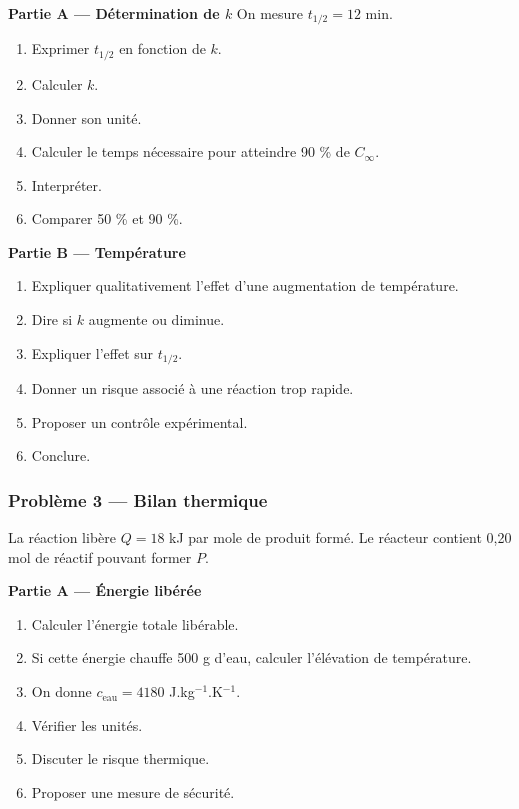 \documentclass[11pt,a4paper]{article}
\begin{document}
\begin{difficile}
\textbf{Partie A — Détermination de $k$}
On mesure $t_{1/2}=12$ min.
\begin{enumerate}
  \item Exprimer $t_{1/2}$ en fonction de $k$.
  \item Calculer $k$.
  \item Donner son unité.
  \item Calculer le temps nécessaire pour atteindre 90 \% de $C_\infty$.
  \item Interpréter.
  \item Comparer 50 \% et 90 \%.
\end{enumerate}

\textbf{Partie B — Température}
\begin{enumerate}
  \item Expliquer qualitativement l'effet d'une augmentation de température.
  \item Dire si $k$ augmente ou diminue.
  \item Expliquer l'effet sur $t_{1/2}$.
  \item Donner un risque associé à une réaction trop rapide.
  \item Proposer un contrôle expérimental.
  \item Conclure.
\end{enumerate}

\subsubsection*{Problème 3 — Bilan thermique}

La réaction libère $Q=18$ kJ par mole de produit formé. Le réacteur contient 0,20 mol de réactif pouvant former $P$.

\textbf{Partie A — Énergie libérée}
\begin{enumerate}
  \item Calculer l'énergie totale libérable.
  \item Si cette énergie chauffe 500 g d'eau, calculer l'élévation de température.
  \item On donne $c_{\mathrm{eau}}=4180$ J.kg$^{-1}$.K$^{-1}$.
  \item Vérifier les unités.
  \item Discuter le risque thermique.
  \item Proposer une mesure de sécurité.
\end{enumerate}


\end{difficile}
\end{document}
